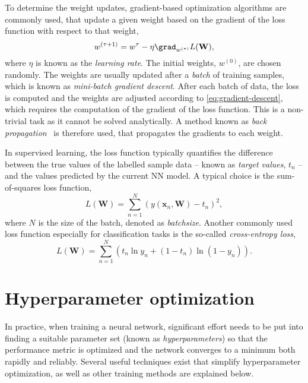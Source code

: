 To determine the weight updates, gradient-based optimization algorithms are commonly used, that update a given weight based on the gradient of the loss function with respect to that weight, 
\begin{equation}
    \label{eq:gradient-descent}
    w^{(\tau+1)} = w^\tau - \eta \grad_{w^{(\tau)}} L(\mathbf{W}),
\end{equation}
where $\eta$ is known as the \emph{learning rate}. 
The initial weights, $w^{(0)}$, are chosen randomly.
The weights are usually updated after a \emph{batch} of training samples, which is known as \emph{mini-batch gradient descent}. 
After each batch of data, the loss is computed and the weights are adjusted according to \cref{eq:gradient-descent}, which requires the computation of the gradient of the loss function. 
This is a non-trivial task as it cannot be solved analytically. 
A method known as \emph{back propagation}~ is therefore used, that propagates the gradients to each weight.  

In supervised learning, the loss function typically quantifies the difference between the true values of the labelled sample data -- known as \emph{target values}, $t_n$ -- and the values predicted by the current NN model. A typical choice is the sum-of-squares loss function,
\begin{equation}
   L(\mathbf{W}) = \sum _{n=1}^{N}\left( y(\mathbf{x}_n, \mathbf{W})-t_n \right)^{2},
\end{equation}
where $N$ is the size of the batch, denoted as \emph{batchsize}. 
Another commonly used loss function especially for classification tasks is the so-called \emph{cross-entropy loss},
\begin{equation}
    L(\mathbf{W}) = \sum _{n=1}^{N}\left( t_n \ln y_n + ( 1 - t_n) \ln (1 - y_n) \right).
\end{equation}


\section{Hyperparameter optimization} 
In practice, when training a neural network, significant effort needs to be put into finding a suitable parameter set (known as \emph{hyperparameters}) so that the performance metric is optimized and the network converges to a minimum both rapidly and reliably. 
Several useful techniques exist that simplify hyperparameter optimization, as well as other training methods are explained below.

